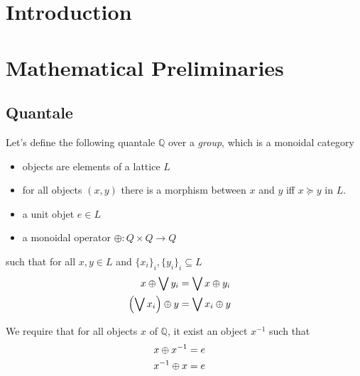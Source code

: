 \documentclass[a4paper]{article}
\begin{document}
\maketitle



\section{Introduction}
\label{sec:intro}

\section{Mathematical Preliminaries}
\label{sec:prelim}


\subsection{Quantale}

Let's define the following quantale $\mathbb{Q}$ over a \emph{group}, which is a monoidal category

\begin{itemize}
\item objects are elements of a lattice $L$
\item for all objects $(x, y)$ there is a morphism between $x$ and $y$ iff $x \succeq y$ in $L$.
\item a unit objet $e \in L$
\item a monoidal operator $\oplus: Q \times Q \to Q$
\end{itemize}

\noindent such that for all $x, y \in L$ and $\{x_i\}_i, \{y_i\}_i \subseteq L$
\begin{align}
x \oplus \bigvee y_i &= \bigvee x \oplus y_i \cr
\left(\bigvee x_i\right) \oplus y &= \bigvee x_i \oplus y
\end{align}

We require that for all objects $x$ of $\mathbb{Q}$, it exist an object $x^{-1}$ such that
\begin{align}
x \oplus x^{-1} &= e \cr
x^{-1} \oplus x &= e
\end{align}

\end{document}
